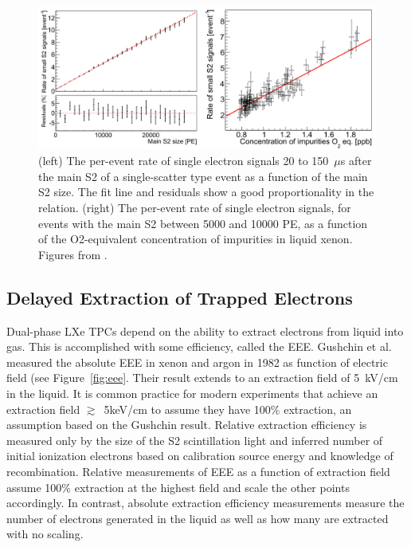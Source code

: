 \begin{figure}[htbp]
\begin{center}
\includegraphics[width=\textwidth]{figures/etrains/electron_rates.png}
\caption{(left) The per-event rate of single electron signals 20 to 150~$\mu$s after the main S2 of a single-scatter type event as a function of the main S2 size. The fit line and residuals show a good proportionality in the relation. (right) The per-event rate of single electron signals, for events with the main S2 between 5000 and 10000 PE, as a function of the O2-equivalent concentration of impurities in liquid xenon. Figures from \cite{Aprile2014}.}
\label{fig:xenon10_s2s}
\end{center}
\end{figure}


\subsection{Delayed Extraction of Trapped Electrons} 
Dual-phase \ac{LXe} \ac{TPC}s depend on the ability to extract electrons from liquid into gas. This is accomplished with some efficiency, called the \ac{EEE}. Gushchin et al. measured the absolute \ac{EEE} in xenon and argon in 1982 as function of electric field  \cite{Gushchin1982} (see Figure~\ref{fig:eee}. Their result extends to an extraction field of 5~kV/cm in the liquid. It is common practice for modern experiments that achieve an extraction field $\gtrsim$~5keV/cm to assume they have 100\% extraction, an assumption based on the Gushchin result. Relative extraction efficiency is measured only by the size of the S2 scintillation light and inferred number of initial ionization electrons based on calibration source energy and knowledge of recombination. Relative measurements of \ac{EEE} as a function of extraction field assume 100\% extraction at the highest field and scale the other points accordingly. In contrast, absolute extraction efficiency measurements measure the number of electrons generated in the liquid as well as how many are extracted with no scaling. 

